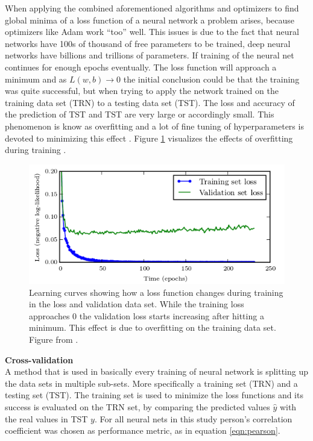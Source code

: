 When applying the combined aforementioned algorithms and optimizers to find global minima of a loss function of a neural network a problem arises, because optimizers like Adam work ``too'' well. This issues is due to the fact that neural networks have 100s of thousand of free parameters to be trained, deep neural networks have billions and trillions of parameters. If training of the neural net continues for enough epochs eventually. The loss function will approach a minimum and as $ L(w,b)\rightarrow 0 $ the initial conclusion could be that the training was quite successful, but when trying to apply the network trained on the training data set (TRN) to a testing data set (TST). The loss and accuracy of the prediction of TST and TST are very large or accordingly small. This phenomenon is know as overfitting and a lot of fine tuning of hyperparameters is devoted to minimizing this effect \cite{tetko1995neural}. Figure \ref{fig:overfitting} visualizes the effects of overfitting during training \cite{goodfellow2016deep}. 

 \begin{figure}[H]
 \centering
 \includegraphics[height=.35\textheight, width=1.1\textwidth]{Figures/overfitting}
 \decoRule
 \caption[Training vs. validation loss over time]{Learning curves showing how a loss function changes during training in the loss and validation data set. While the training loss approaches 0 the validation loss starts increasing after hitting a minimum. This effect is due to overfitting on the training data set. Figure from \cite{goodfellow2016deep}.}
 \label{fig:overfitting}
\end{figure}

\textbf{Cross-validation} \\

A method that is used in basically every training of neural network is splitting up the data sets in multiple sub-sets.
More specifically a training set (TRN) and a testing set (TST). The training set is used to minimize the loss functions
and its success is evaluated on the TRN set, by comparing the predicted values $\hat{y}$ with the real values in TST
$y$.  For all neural nets in this study person's correlation coefficient was chosen as performance metric, as in
equation \ref{eqn:pearson}.

